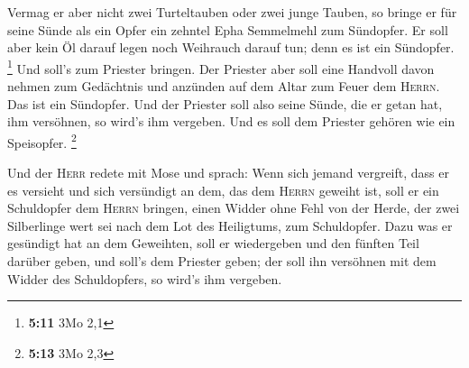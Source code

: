 Vermag er aber nicht zwei Turteltauben oder zwei junge
Tauben, so bringe er für seine Sünde als ein Opfer ein zehntel Epha
Semmelmehl zum Sündopfer. Er soll aber kein Öl darauf legen noch
Weihrauch darauf tun; denn es ist ein Sündopfer. \footnote{\textbf{5:11}
  3Mo 2,1}  Und soll's zum Priester bringen. Der Priester
aber soll eine Handvoll davon nehmen zum Gedächtnis und anzünden auf dem
Altar zum Feuer dem \textsc{Herrn}. Das ist ein Sündopfer.
 Und der Priester soll also seine Sünde, die er getan
hat, ihm versöhnen, so wird's ihm vergeben. Und es soll dem Priester
gehören wie ein Speisopfer. \footnote{\textbf{5:13} 3Mo 2,3}

 Und der \textsc{Herr} redete mit Mose und sprach:
 Wenn sich jemand vergreift, dass er es versieht und sich
versündigt an dem, das dem \textsc{Herrn} geweiht ist, soll er ein
Schuldopfer dem \textsc{Herrn} bringen, einen Widder ohne Fehl von der
Herde, der zwei Silberlinge wert sei nach dem Lot des Heiligtums, zum
Schuldopfer.  Dazu was er gesündigt hat an dem Geweihten,
soll er wiedergeben und den fünften Teil darüber geben, und soll's dem
Priester geben; der soll ihn versöhnen mit dem Widder des Schuldopfers,
so wird's ihm vergeben.

